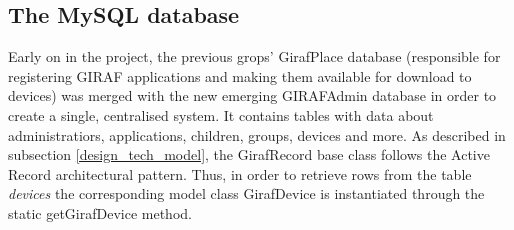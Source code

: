 \subsection{The MySQL database}
Early on in the project, the previous grops' GirafPlace database (responsible for registering GIRAF applications and making them available for download to devices) was merged with the new emerging GIRAFAdmin database in order to create a single, centralised system. It contains tables with data about administratiors, applications, children, groups, devices and more.
As described in subsection \vref{design_tech_model}, the GirafRecord base class follows the Active Record architectural pattern. Thus, in order to retrieve rows from the table \emph{devices} the corresponding model class GirafDevice is instantiated through the static getGirafDevice method.

